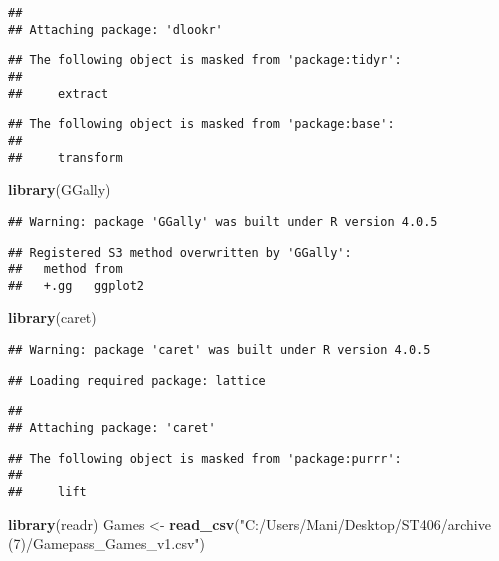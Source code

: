 \documentclass[
]{article}
\newenvironment{Shaded}{\begin{snugshade}}{\end{snugshade}}
\newcommand{\KeywordTok}[1]{\textcolor[rgb]{0.13,0.29,0.53}{\textbf{#1}}}
\newcommand{\NormalTok}[1]{#1}
\newcommand{\StringTok}[1]{\textcolor[rgb]{0.31,0.60,0.02}{#1}}
\begin{document}
\begin{verbatim}
## 
## Attaching package: 'dlookr'
\end{verbatim}

\begin{verbatim}
## The following object is masked from 'package:tidyr':
## 
##     extract
\end{verbatim}

\begin{verbatim}
## The following object is masked from 'package:base':
## 
##     transform
\end{verbatim}

\begin{Shaded}
\begin{Highlighting}[]
\KeywordTok{library}\NormalTok{(GGally)}
\end{Highlighting}
\end{Shaded}

\begin{verbatim}
## Warning: package 'GGally' was built under R version 4.0.5
\end{verbatim}

\begin{verbatim}
## Registered S3 method overwritten by 'GGally':
##   method from   
##   +.gg   ggplot2
\end{verbatim}

\begin{Shaded}
\begin{Highlighting}[]
\KeywordTok{library}\NormalTok{(caret)}
\end{Highlighting}
\end{Shaded}

\begin{verbatim}
## Warning: package 'caret' was built under R version 4.0.5
\end{verbatim}

\begin{verbatim}
## Loading required package: lattice
\end{verbatim}

\begin{verbatim}
## 
## Attaching package: 'caret'
\end{verbatim}

\begin{verbatim}
## The following object is masked from 'package:purrr':
## 
##     lift
\end{verbatim}

\begin{Shaded}
\begin{Highlighting}[]
\KeywordTok{library}\NormalTok{(readr)}
\NormalTok{Games <-}\StringTok{ }\KeywordTok{read_csv}\NormalTok{(}\StringTok{"C:/Users/Mani/Desktop/ST406/archive (7)/Gamepass_Games_v1.csv"}\NormalTok{)}
\end{Highlighting}
\end{Shaded}
\end{document}
